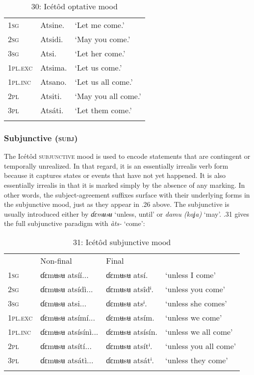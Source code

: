 \begin{table}
\caption{30: Icétôd optative mood}
\label{tab:8}


\begin{tabularx}{\textwidth}{XXX}
\lsptoprule

\textsc{1sg} & Atsine. & ‘Let me come.’\\
\textsc{2sg} & Atsidi. & ‘May you come.’\\
\textsc{3sg} & Atsi. & ‘Let her come.’\\
\textsc{1pl.exc} & Atsima. & ‘Let us come.’\\
\textsc{1pl.inc} & Atsano. & ‘Let us all come.’\\
\textsc{2pl} & Atsiti. & ‘May you all come.’\\
\textsc{3pl} & Atsáti. & ‘Let them come.’\\
\lspbottomrule
\end{tabularx}
\end{table}

\subsubsection{Subjunctive (\textsc{subj})}

The Icétôd \textsc{subjunctive} mood is used to encode statements that are contingent or temporally unrealized. In that regard, it is an essentially irrealis verb form because it captures states or events that have not yet happened. It is also essentially irrealis in that it is marked simply by the absence of any marking. In other words, the subject-agreement suffixes surface with their underlying forms in the subjunctive mood, just as they appear in .26 above. The subjunctive is usually introduced either by \textit{ɗɛmʉsʉ} ‘unless, until’ or \textit{damu (koʝa)} ‘may’. .31 gives the full subjunctive paradigm with \textit{àts-} ‘come’:


\begin{table}
\caption{31: Icétôd subjunctive mood}
\label{tab:8}


\begin{tabularx}{\textwidth}{XXXX} & Non-final & Final & \\
\lsptoprule
\textsc{1sg} & ɗɛmʉsʉ atsíí... & ɗɛmʉsʉ atsí. & ‘unless I come’\\
\textsc{2sg} & ɗɛmʉsʉ atsídì... & ɗɛmʉsʉ atsîdⁱ. & ‘unless you come’\\
\textsc{3sg} & ɗɛmʉsʉ atsi... & ɗɛmʉsʉ atsⁱ. & ‘unless she comes’\\
\textsc{1pl.exc} & ɗɛmʉsʉ atsímí... & ɗɛmʉsʉ atsím. & ‘unless we come’\\
\textsc{1pl.inc} & ɗɛmʉsʉ atsísínì... & ɗɛmʉsʉ atsísín. & ‘unless we all come’\\
\textsc{2pl} & ɗɛmʉsʉ atsítí... & ɗɛmʉsʉ atsítⁱ. & ‘unless you all come’\\
\textsc{3pl} & ɗɛmʉsʉ atsátì... & ɗɛmʉsʉ atsátⁱ. & ‘unless they come’\\
\lspbottomrule
\end{tabularx}
\end{table}

